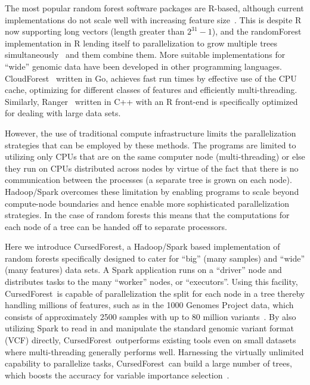 \documentclass[10pt,letterpaper]{article}
\newcommand{\cursedforest}{{\sc CursedForest}}
\begin{document}
The most popular random forest software packages are R-based, although current implementations do not scale well with
increasing feature size~\cite{Wright.and.Ziegle.2016}.  This is despite R now supporting long vectors (length greater
than $2^{31}-1$), and the {\sc randomForest} implementation in R lending itself to parallelization to grow multiple trees
simultaneously~\cite{Liaw.and.Weiner.2002} and them combine them.  More suitable implementations for ``wide'' genomic data have been
developed in other programming languages. {\sc CloudForest}~\cite{Bressler2015} written in Go, achieves fast run
times by effective use of the CPU cache, optimizing for different classes of features and efficiently multi-threading.
Similarly, {\sc Ranger}~\cite{Wright.and.Ziegle.2016} written in C++ with an R front-end is specifically optimized for
dealing with large data sets.

However, the use of traditional compute infrastructure limits the parallelization strategies that can be employed by
these methods.  The programs are limited to utilizing only CPUs that are on the same computer node (multi-threading) or
else they run on CPUs distributed across nodes by virtue of the fact that there is no communication between the
processes (a separate tree is grown on each node).  Hadoop/Spark overcomes these limitation by enabling programs to
scale beyond compute-node boundaries and hence enable more sophisticated parallelization strategies.  In the case of
random forests this means that the computations for each node of a tree can be handed off to separate processors.
  
Here we introduce \cursedforest, a Hadoop/Spark based implementation of random forests specifically designed to cater
for ``big'' (many samples) and ``wide'' (many features) data sets. A Spark application runs on a ``driver'' node and
distributes tasks to the many ``worker'' nodes, or ``executors''. Using this facility, \cursedforest\ is capable of
parallelization the split for each node in a tree thereby handling millions of features, such as in the 1000 Genomes
Project data, which consists of approximately 2500 samples with up to 80 million variants~\cite{1KG2012}.  By also
utilizing Spark to read in and manipulate the standard genomic variant format (VCF) directly, \cursedforest\ outperforms
existing tools even on small datasets where multi-threading generally performs well. Harnessing the virtually unlimited
capability to parallelize tasks, \cursedforest\ can build a large number of trees, which boosts the accuracy for
variable importance selection~\cite{Szymczak2016}.
\end{document}
